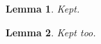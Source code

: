 \documentclass{article}
\newtheorem{lemma}{Lemma}
\newif\iflong
\begin{document}
\begin{lemma}
Kept.
\end{lemma}

\iflong
\begin{lemma}
Only in the long version.
\end{lemma}
\fi
\begin{lemma}
Kept too.
\end{lemma}
\end{document}

